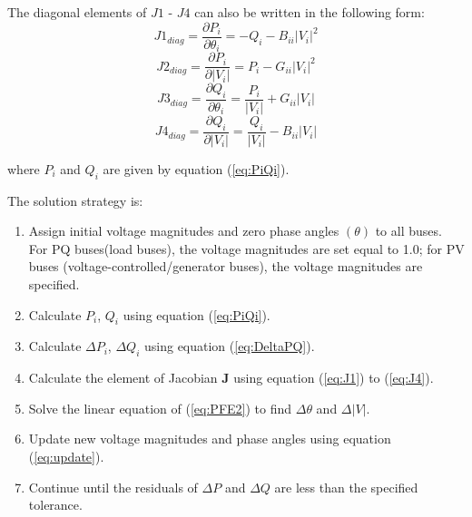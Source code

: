 \documentclass[12pt]{article}
\begin{document}
The diagonal elements of $J1$ - $J4$ can also be written in the following form:
\begin{equation}\label{eq:J1D}
J1_{diag} = \frac{\partial P_i}{\partial \theta_i} = -Q_i - B_{ii}|V_i|^2
\end{equation} 
\begin{equation}\label{eq:J2D}
J2_{diag} = \frac{\partial P_i}{\partial |V_i|} = P_i - G_{ii}|V_i|^2
\end{equation} 
\begin{equation}\label{eq:J3D}
J3_{diag} = \frac{\partial Q_i}{\partial \theta_i} = \frac{P_i}{|V_i|} + G_{ii}|V_i|
\end{equation} 
\begin{equation}\label{eq:J4D}
J4_{diag} = \frac{\partial Q_i}{\partial |V_i|} = \frac{Q_i}{|V_i|} - B_{ii}|V_i|
\end{equation} 

where $P_i$ and $Q_i$ are given by equation (\ref{eq:PiQi}).

The solution strategy is:
\begin{enumerate}
\item Assign initial voltage magnitudes and zero phase angles $\left ( \theta \right )$
to all buses. For PQ buses(load buses), the voltage magnitudes are set equal to 1.0;
for PV buses (voltage-controlled/generator buses), the voltage magnitudes are specified.
\item Calculate $P_{i}$, $Q_i$ using equation (\ref{eq:PiQi}).
\item Calculate $\Delta P_{i}$, $\Delta Q_{i}$ using equation (\ref{eq:DeltaPQ}).
\item Calculate the element of Jacobian $\mathbf{J}$ using equation (\ref{eq:J1}) to (\ref{eq:J4}).
\item Solve the linear equation of (\ref{eq:PFE2}) to find $\Delta \theta$ and $\Delta |V|$.
\item Update new voltage magnitudes and phase angles using equation (\ref{eq:update}).
\item Continue until the residuals of $\Delta P$ and $\Delta Q$ are less than the specified tolerance. 
\end{enumerate}
\end{document}
